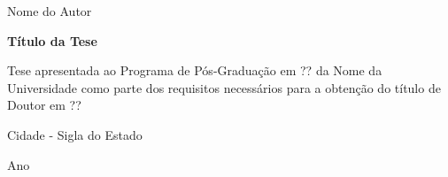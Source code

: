 \documentclass[12pt,oneside]{book} %
\begin{document}





    \newpage
    \thispagestyle{empty} %

    \begin{center}
        \small{Nome do Autor}
    \end{center}

    \vspace{3cm}

    \begin{center}
        \Large{\textbf{Título da Tese}} %
    \end{center}

    \vspace{2cm}

    \begin{flushright}
        \begin{minipage}{0.5\textwidth}
            Tese apresentada ao Programa de Pós-Graduação em ?? da Nome da Universidade como parte dos requisitos necessários para a obtenção do título de Doutor em ??
        \end{minipage}
    \end{flushright}

    \vspace{13cm}

    \begin{center}
        Cidade - Sigla do Estado
    \end{center}

    \vspace{-0.8cm}

    \begin{center}
        Ano
    \end{center}
\end{document}
